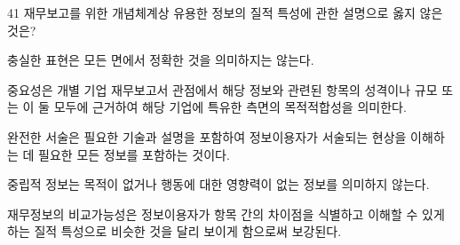 \begin{question}{41}
재무보고를 위한 개념체계상 유용한 정보의 질적 특성에 관한 설명으로 옳지 않은 것은?
\begin{choices}
  \item 충실한 표현은 모든 면에서 정확한 것을 의미하지는 않는다.
  \item 중요성은 개별 기업 재무보고서 관점에서 해당 정보와 관련된 항목의 성격이나 규모 또는 이 둘 모두에 근거하여 해당 기업에 특유한 측면의 목적적합성을 의미한다.
  \item 완전한 서술은 필요한 기술과 설명을 포함하여 정보이용자가 서술되는 현상을 이해하는 데 필요한 모든 정보를 포함하는 것이다.
  \item 중립적 정보는 목적이 없거나 행동에 대한 영향력이 없는 정보를 의미하지 않는다.
  \item 재무정보의 비교가능성은 정보이용자가 항목 간의 차이점을 식별하고 이해할 수 있게 하는 질적 특성으로 비슷한 것을 달리 보이게 함으로써 보강된다.
\end{choices}
\end{question}
